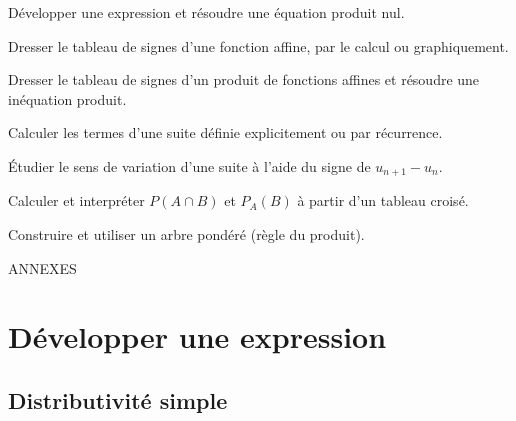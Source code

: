 \documentclass[10pt,a4paper]{article}
\begin{document}
Développer une expression et résoudre une équation produit nul.\par\smallskip
Dresser le tableau de signes d'une fonction affine, par le calcul ou graphiquement.\par\smallskip
Dresser le tableau de signes d'un produit de fonctions affines et résoudre une inéquation produit.\par\smallskip
Calculer les termes d'une suite définie explicitement ou par récurrence.\par\smallskip
Étudier le sens de variation d'une suite à l'aide du signe de \(u_{n+1}-u_n\).\par\smallskip
Calculer et interpréter \(P(A\cap B)\) et \(P_A(B)\) à partir d'un tableau croisé.\par\smallskip
Construire et utiliser un arbre pondéré (règle du produit).


\newpage

\begin{center}
    \Huge ANNEXES
\end{center}

\appendix

\section{Développer une expression} \label{annexe-developper}

\subsection{Distributivité simple}
\end{document}
